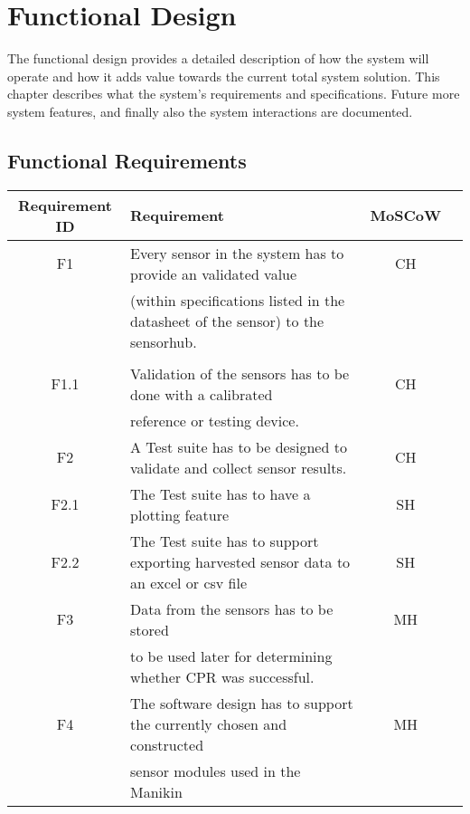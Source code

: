 \chapter{Functional Design}
\label{chapter:requirements} 
The functional design provides a detailed description of how the system will operate and how it adds value towards the current total system solution.
\newline
This chapter describes what the system's requirements and specifications. Future more system features, and finally also the system interactions are documented.

\section{Functional Requirements}
\begin{table}[hb!]
\begin{tabular}{ |c|l|c|c| } 
 \hline
 Requirement ID & Requirement & MoSCoW \\ 
 \hline
 \hline
 F1    & Every sensor in the system has to provide an validated value  & CH \\ 
       & (within specifications listed in the datasheet of the sensor) to the sensorhub.  &  \\
       &                                                                                  &  \\
\hline
 F1.1  & Validation of the sensors has to be done with a calibrated                       & CH \\
       & reference or testing device.                                                     &   \\
\hline
 F2    & A Test suite has to be designed to validate and collect sensor results.          & CH \\
 \hline
 F2.1  & The Test suite has to have a plotting feature                                    & SH \\
 \hline 
 F2.2  & The Test suite has to support exporting harvested sensor data to an excel or csv file & SH \\
 \hline
 F3    & Data from the sensors has to be stored & MH\\
       & to be used later for determining whether CPR was successful.  & \\
\hline
 F4    & The software design has to support the currently chosen and constructed & MH  \\
       & sensor modules used in the Manikin & \\

\end{tabular}
\end{table}
